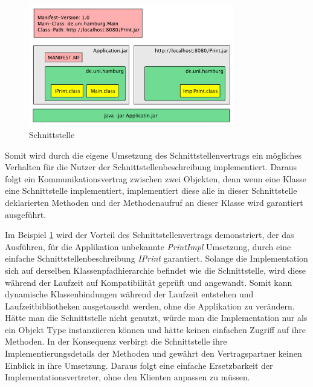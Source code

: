   \begin{figure}[h!]
    \centering
    \includegraphics[width=0.8\textwidth]{material/images/Classpath-Interface-Implimentation.pdf}
    \caption{Schnittstelle}
    \label{fig:schnitt}
  \end{figure}

  Somit wird durch die eigene Umsetzung des Schnittstellenvertrags ein mögliches Verhalten für die Nutzer der Schnittstellenbeschreibung implementiert. Daraus folgt ein Kommunikationsvertrag zwischen zwei Objekten, denn wenn eine Klasse eine Schnittstelle implementiert, implementiert diese alle in dieser Schnittstelle deklarierten Methoden und der Methodenaufruf an dieser Klasse wird garantiert ausgeführt.\bigbreak 
  
  Im Beispiel \ref{fig:schnitt} wird der Vorteil des Schnittstellenvertrags demonstriert, der das Ausführen, für die Applikation unbekannte \textit{PrintImpl} Umsetzung, durch eine einfache Schnittstellenbeschreibung \textit{IPrint} garantiert. Solange die Implementation sich auf derselben Klassenpfadhierarchie befindet wie die Schnittstelle, wird diese während der Laufzeit auf Kompatibilität geprüft und angewandt. Somit kann dynamische Klassenbindungen während der Laufzeit entstehen und Laufzeitbibliotheken ausgetauscht werden, ohne die Applikation zu verändern. Hätte man die Schnittstelle nicht genutzt, würde man die Implementation nur als ein Objekt Type instanziieren können und hätte keinen einfachen Zugriff auf ihre Methoden. In der Konsequenz verbirgt die Schnittstelle ihre Implementierungsdetails der Methoden und gewährt den Vertragspartner keinen Einblick in ihre Umsetzung. Daraus folgt eine einfache Ersetzbarkeit der Implementationsvertreter, ohne den Klienten anpassen zu müssen. \cite{Forman04javareflection}

